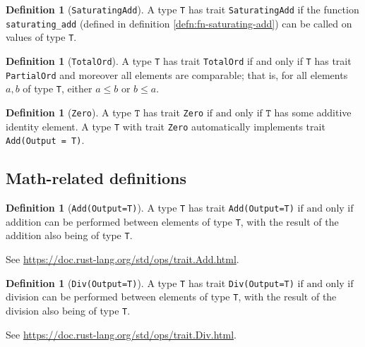 \documentclass[11pt,a4paper]{article}
\theoremstyle{definition}
\newtheorem{definition}[theorem]{Definition}
\newcommand{\inRust}[2]{See \url{#2}.}
\newcommand{\T}{\texttt{T}}
\newcommand{\iffText}{\text{if and only if}}
\begin{document}
\begin{definition}[\texttt{SaturatingAdd}]
    A type \texttt{T} has trait \texttt{SaturatingAdd} if the function \texttt{saturating\_add} (defined in definition \ref{defn:fn-saturating-add}) can be called on values of type \texttt{T}.
\end{definition}

\begin{definition}[\texttt{TotalOrd}]
\label{defn:trait-totalord}
    \label{defn:totalord}
    A type \texttt{T} has trait \texttt{TotalOrd} if and only if \texttt{T} has trait \texttt{PartialOrd} and moreover all elements are comparable; that is, for all elements $a, b$ of type \texttt{T}, either $a \leq b$ or $b \leq a$.
    
    
\end{definition}

\begin{definition}[\texttt{Zero}]
A type $\T$ has trait \texttt{Zero} $\iffText$ $\T$ has some additive identity element. A type \texttt{T} with trait \texttt{Zero} automatically implements trait \texttt{Add(Output = T)}.
\end{definition}

\subsection{Math-related definitions}
\begin{definition}[\texttt{Add(Output=T)}]
    A type \texttt{T} has trait \texttt{Add(Output=T)} $\iffText$ addition can be performed between elements of type \texttt{T}, with the result of the addition also being of type \texttt{T}.
    
    \inRust{Trait std::ops::Add}{https://doc.rust-lang.org/std/ops/trait.Add.html}

\end{definition}

\begin{definition}[\texttt{Div(Output=T)}]
    A type \texttt{T} has trait \texttt{Div(Output=T)} $\iffText$ division can be performed between elements of type \texttt{T}, with the result of the division also being of type \texttt{T}.
    
    \inRust{Trait std::ops::Div}{https://doc.rust-lang.org/std/ops/trait.Div.html}
\end{definition}
\end{document}
